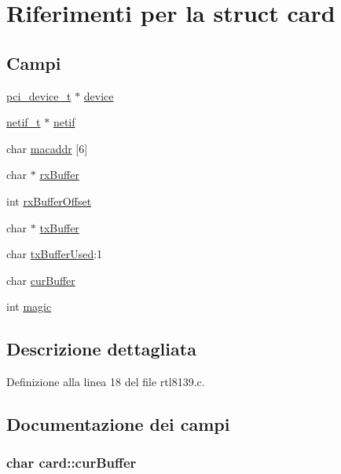 \hypertarget{structcard}{\section{Riferimenti per la struct card}
\label{structcard}
}
\subsection*{Campi}
\begin{DoxyCompactItemize}
\item 
\hyperlink{pci_8h_ab3c98ba0de1f963ef2f46200b090815b}{pci\+\_\+device\+\_\+t} $\ast$ \hyperlink{structcard_ac4d735012434df4c445edaffce28bd73}{device}
\item 
\hyperlink{netif_8h_af6c73b8fa12396c0382f58d63e895008}{netif\+\_\+t} $\ast$ \hyperlink{structcard_ab3123a3dbb6dc38d86488ab37f7759ae}{netif}
\item 
char \hyperlink{structcard_abe96f3126aa0a28b86a1748ad1f83f81}{macaddr} \mbox{[}6\mbox{]}
\item 
char $\ast$ \hyperlink{structcard_a5cd3278f0e24fb6942e726b61bb032a6}{rx\+Buffer}
\item 
int \hyperlink{structcard_a9492d8053fa4c304877e1f9959b48731}{rx\+Buffer\+Offset}
\item 
char $\ast$ \hyperlink{structcard_a733cf5ffa3a9d2bf6cf28473817915b6}{tx\+Buffer}
\item 
char \hyperlink{structcard_a2294d3601ad6be7638b30f68496d589e}{tx\+Buffer\+Used}\+:1
\item 
char \hyperlink{structcard_adc7cfe07c57eb29b36d674ce0312c7ac}{cur\+Buffer}
\item 
int \hyperlink{structcard_a63721f311b12c89790089bbcacc0060b}{magic}
\end{DoxyCompactItemize}


\subsection{Descrizione dettagliata}


Definizione alla linea 18 del file rtl8139.\+c.



\subsection{Documentazione dei campi}
\hypertarget{structcard_adc7cfe07c57eb29b36d674ce0312c7ac}{
\subsubsection[{cur\+Buffer}]{\setlength{\rightskip}{0pt plus 5cm}char card\+::cur\+Buffer}}\label{structcard_adc7cfe07c57eb29b36d674ce0312c7ac}


